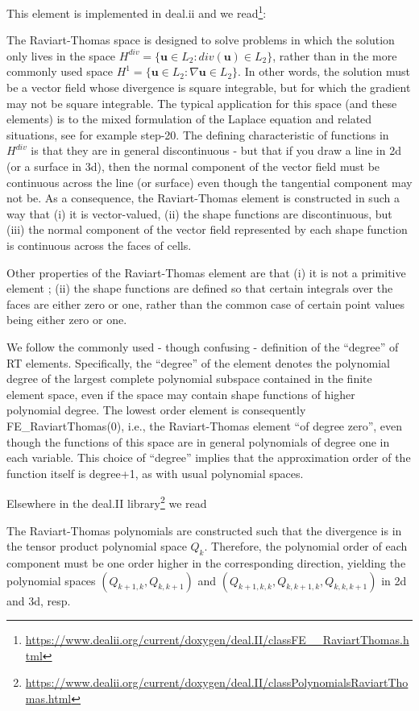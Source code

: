 This element is implemented in deal.ii and we 
read\footnote{\url{https://www.dealii.org/current/doxygen/deal.II/classFE__RaviartThomas.html}}:
\begin{displayquote}
{\color{darkgray}
The Raviart-Thomas space is designed to solve problems in which the solution only 
lives in the space $H^{div}=\{ {\bm u} \in L_2 :div({\bm u}) \in L_2\}$, 
rather than in the more commonly used space $H^1=\{ {\bm u} \in L_2 : \nabla {\bm u} \in L_2 \}$. 
In other words, the solution must be a vector field whose divergence is square integrable, 
but for which the gradient may not be square integrable. The typical application for this space 
(and these elements) is to the mixed formulation of the Laplace equation and related situations, 
see for example step-20. The defining characteristic of functions in  $H^{div}$ is that they are 
in general discontinuous - but that if you draw a line in 2d (or a surface in 3d), 
then the normal component of the vector field must be continuous across the line (or surface) 
even though the tangential component may not be. As a consequence, the Raviart-Thomas element 
is constructed in such a way that (i) it is vector-valued, (ii) the shape functions are 
discontinuous, but (iii) the normal component of the vector field represented by each shape 
function is continuous across the faces of cells.

Other properties of the Raviart-Thomas element are that 
(i) it is not a primitive element ; 
(ii) the shape functions are defined so that certain integrals over the faces are 
either zero or one, rather than the common case of certain point values being 
either zero or one. 

We follow the commonly used - though confusing - definition of the ``degree'' of RT elements. 
Specifically, the ``degree'' of the element denotes the polynomial degree of the 
largest complete polynomial subspace contained in the finite element space, 
even if the space may contain shape functions of higher polynomial degree. 
The lowest order element is consequently FE\_RaviartThomas(0), i.e., 
the Raviart-Thomas element ``of degree zero'', even though the functions of this space 
are in general polynomials of degree one in each variable. This choice of ``degree'' 
implies that the approximation order of the function itself is degree+1, as with usual polynomial spaces. 
}
\end{displayquote}

Elsewhere in the deal.II library\footnote{\url{https://www.dealii.org/current/doxygen/deal.II/classPolynomialsRaviartThomas.html}} we read
\begin{displayquote}
{\color{darkgray}
The Raviart-Thomas polynomials are constructed such that the divergence is 
in the tensor product polynomial space $Q_k$. Therefore, the polynomial order of each component 
must be one order higher in the corresponding direction, yielding the polynomial spaces 
$(Q_{k+1,k}, Q_{k,k+1})$ and $(Q_{k+1,k,k}, Q_{k,k+1,k}, Q_{k,k,k+1})$ in 2d and 3d, resp. 
}
\end{displayquote}


